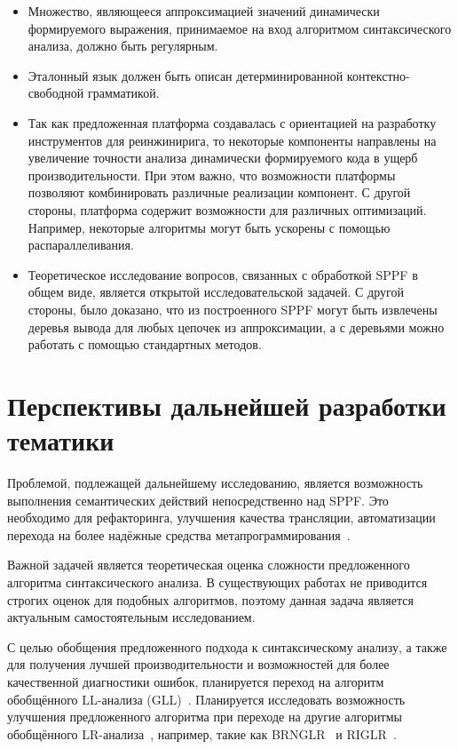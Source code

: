 \begin{itemize}
    \item Множество, являющееся аппроксимацией значений динамически формируемого выражения, принимаемое на вход алгоритмом синтаксического анализа, должно быть регулярным.
    \item Эталонный язык должен быть описан детерминированной контекстно-свободной грамматикой.
    \item Так как предложенная платформа создавалась с ориентацией на разработку инструментов для реинжинирига, то некоторые компоненты направлены на увеличение точности анализа динамически формируемого кода в ущерб производительности. При этом важно, что возможности платформы позволяют комбинировать различные реализации компонент. С другой стороны, платформа содержит возможности для различных оптимизаций. Например, некоторые алгоритмы могут быть ускорены с помощью распараллеливания.
    \item Теоретическое исследование вопросов, связанных с обработкой SPPF в общем виде, является открытой исследовательской задачей. С другой стороны, было доказано, что из построенного SPPF могут быть извлечены деревья вывода для любых цепочек из аппроксимации, а с деревьями можно работать с помощью стандартных методов. 
\end{itemize}

\section*{Перспективы дальнейшей разработки тематики}

Проблемой, подлежащей дальнейшему исследованию, является возможность выполнения семантических действий непосредственно над SPPF. Это необходимо для рефакторинга, улучшения качества трансляции, автоматизации перехода на более надёжные средства метапрограммирования~\cite{JSStagedMetaProgramming,JSStagedMetaProgrammingFull}.

Важной задачей является теоретическая оценка сложности предложенного алгоритма синтаксического анализа. В существующих работах не приводится строгих оценок для подобных алгоритмов, поэтому данная задача является актуальным самостоятельным исследованием.

С целью обобщения предложенного подхода к синтаксическому анализу, а также для получения лучшей производительности и возможностей для более качественной диагностики ошибок, планируется переход на алгоритм обобщённого LL-анализа (GLL)~\cite{GLL,AbstractGLL,FastGLL,scott2013gll}. Планируется исследовать возможность улучшения предложенного алгоритма при переходе на другие алгоритмы обобщённого LR-анализа~\cite{GeneralisedlrBIG}, например, такие как BRNGLR~\cite{BRNGLR} и RIGLR~\cite{RIGLR}.

